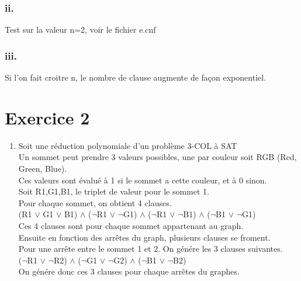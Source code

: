 \documentclass[12pt]{report}
\begin{document}
\subsubsection*{ii.}
Test sur la valeur n=2, voir le fichier e.cnf

\subsubsection*{iii.}
Si l'on fait croitre n, le nombre de clause augmente de façon exponentiel.
\newpage
\section*{Exercice 2}
\begin{enumerate}
\item Soit une réduction polynomiale d'un problème 3-COL à SAT \\
Un sommet peut prendre 3 valeurs possibles, une par couleur soit RGB (Red, Green, Blue). \\
Ces valeurs sont évalué à 1 si le sommet a cette couleur, et à 0 sinon. \\
Soit R1,G1,B1, le triplet de valeur pour le sommet 1. \\

\noindent Pour chaque sommet, on obtient 4 clauses. \\
(R1 $\lor$ G1 $\lor$ B1) $\land$ ($\lnot$R1 $\lor$ $\lnot$G1) $\land$ ($\lnot$R1 $\lor$ $\lnot$B1) $\land$ ($\lnot$B1 $\lor$ $\lnot$G1)\\
Ces 4 clauses sont pour chaque sommet appartenant au graph.\\

\noindent Ensuite en fonction des arrêtes du graph, plusieurs clauses se froment. \\
Pour une arrête entre le sommet 1 et 2. On génére les 3 clauses suivantes. \\
($\lnot$R1 $\lor$ $\lnot$R2) $\land$ ($\lnot$G1 $\lor$ $\lnot$G2) $\land$ ($\lnot$B1 $\lor$ $\lnot$B2)\\
On génére donc ces 3 clauses pour chaque arrêtes du graphes. \\


\end{enumerate}
\end{document}
